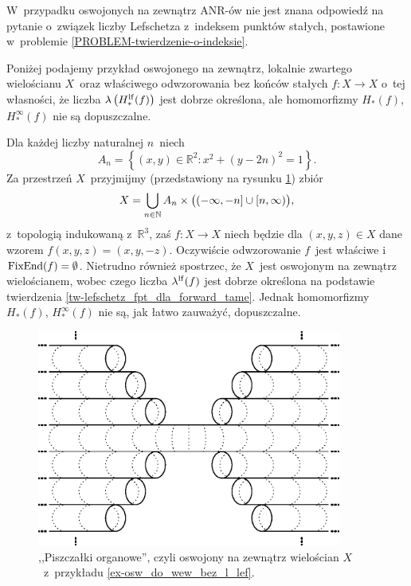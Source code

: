W~przypadku oswojonych na zewnątrz ANR-ów nie jest znana odpowiedź na pytanie o~związek liczby Lefschetza z~indeksem punktów stałych, postawione w~problemie \ref{PROBLEM-twierdzenie-o-indeksie}.

Poniżej podajemy przykład oswojonego na zewnątrz, lokalnie zwartego wielościanu $X$~oraz właściwego odwzorowania bez końców stałych $f\colon X\to X$ o~tej własności, że liczba $\lambda\left(H_*^{\mathrm{lf}}(f)\right)$ jest dobrze określona, ale homomorfizmy $H_*(f)$, $H_*^\infty(f)$ nie są dopuszczalne.

\begin{ex}\label{ex-osw_do_wew_bez_l_lef}
Dla każdej liczby naturalnej $n$~niech \[A_n=\left\{(x,y)\in\mathbb{R}^2:x^2+(y-2n)^2=1\right\}.\] Za przestrzeń $X$~przyjmijmy (przedstawiony na rysunku \ref{fig-organy}) zbiór
\[X=\bigcup_{n\in\mathbb{N}}A_n\times \bigl( (-\infty,-n]\cup [n,\infty) \bigr),\] 
z~topologią indukowaną z~$\mathbb{R}^3$, zaś $f\colon X\to X$ niech będzie dla $(x,y,z)\in X$ dane wzorem $f(x,y,z)=(x,y,-z)$. Oczywiście odwzorowanie $f$~jest właściwe i~$\operatorname{FixEnd}(f)=\emptyset$. Nietrudno również spostrzec, że $X$~jest oswojonym na zewnątrz wielościanem, wobec czego liczba $\lambda^{\mathrm{lf}}(f)$ jest dobrze określona na podstawie twierdzenia \ref{tw-lefschetz_fpt_dla_forward_tame}. Jednak homomorfizmy $H_*(f)$, $H^\infty_*(f)$ nie są, jak łatwo zauważyć, dopuszczalne.
\end{ex}

\begin{figure}[h]
\centering
\includegraphics[width=100mm]{img/organki.eps}
\caption{,,Piszczałki organowe'', czyli oswojony na zewnątrz wielościan $X$~z~przykładu \ref{ex-osw_do_wew_bez_l_lef}.}\label{fig-organy}
\end{figure}








